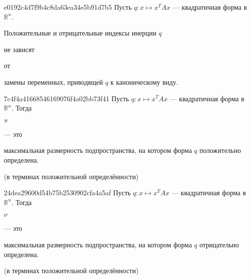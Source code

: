\begin{note}{e0192c4d7f9b4c8da63ea34e5b91d7b5}
    Пусть \({ q : x \mapsto x^{T}Ax }\) --- квадратичная форма в \({ \mathbb R^{n} }\).
    \begin{icloze}{3}Положительные и отрицательные индексы инерции \({ q }\)\end{icloze} \begin{icloze}{2}не зависят\end{icloze} от \begin{icloze}{1}замены переменных, приводящей \({ q }\) к каноническому виду.\end{icloze}
\end{note}

\begin{note}{7c4f4a41668546169076f4a02bb73f41}
    Пусть \({ q : x \mapsto x^{T}Ax }\) --- квадратичная форма в \({ \mathbb R^{n} }\).
    Тогда \begin{icloze}{2}\({ \pi }\)\end{icloze} --- это \begin{icloze}{1}максимальная размерность подпространства, на котором форма \({ q }\) положительно определена.\end{icloze}

    \begin{center}
        \tiny
        (в терминах положительной определённости)
    \end{center}
\end{note}

\begin{note}{24dea29600d54b75b2530902cfa4a5af}
    Пусть \({ q : x \mapsto x^{T}Ax }\) --- квадратичная форма в \({ \mathbb R^{n} }\).
    Тогда \begin{icloze}{2}\({ \nu }\)\end{icloze} --- это \begin{icloze}{1}максимальная размерность подпространства, на котором форма \({ q }\) отрицательно определена.\end{icloze}

    \begin{center}
        \tiny
        (в терминах положительной определённости)
    \end{center}
\end{note}

